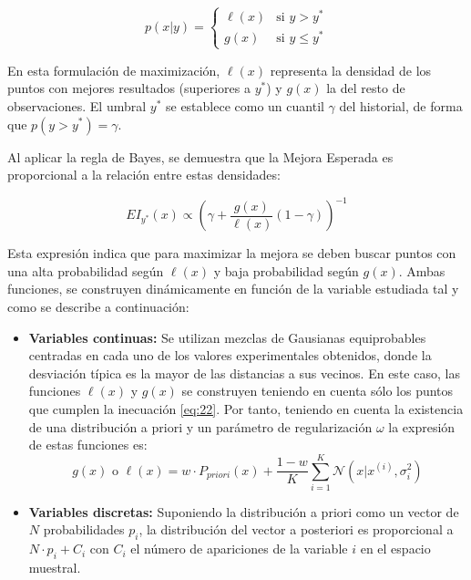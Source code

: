 \documentclass[11pt,a4paper]{article}
\begin{document}
	\begin{equation}
		p(x|y) = 
		\begin{cases} 
			\ell(x) & \text{si } y > y^* \\ g(x) & \text{si } y \leq y^*
		 \end{cases}
		 \label{eq:22}
	\end{equation}
	
	En esta formulación de maximización, $\ell(x)$ representa la densidad de los puntos con mejores resultados (superiores a $y^*$) y $g(x)$ la del resto de observaciones. El umbral $y^*$ se establece como un cuantil $\gamma$ del historial, de forma que $p(y > y^*) = \gamma$. 
	\newline
	
	Al aplicar la regla de Bayes, se demuestra que la Mejora Esperada es proporcional a la relación entre estas densidades:
	
	\begin{equation}
		EI_{y^*}(x) \propto \left( \gamma + \frac{g(x)}{\ell(x)}(1 - \gamma) \right)^{-1}
	\end{equation}
	
	Esta expresión indica que para maximizar la mejora se deben buscar puntos con una alta probabilidad según $\ell(x)$ y baja probabilidad según $g(x)$. Ambas funciones, se construyen dinámicamente en función de la variable estudiada tal y como se describe a continuación:
	\begin{itemize}
		\item \textbf{Variables continuas:} Se utilizan mezclas de Gausianas equiprobables centradas en cada uno de los valores experimentales obtenidos, donde la desviación típica es la mayor de las distancias a sus vecinos. En este caso, las funciones \(\ell(x)\) y $g(x)$ se construyen teniendo en cuenta sólo los puntos que cumplen la inecuación \ref{eq:22}. Por tanto, teniendo en cuenta la existencia de una distribución a priori y un parámetro de regularización $\omega$ la expresión de estas funciones es:
		\begin{equation}
				g(x)\text{ o }  \ell(x)= w \cdot P_{priori}(x) + \frac{1-w}{K} \sum_{i=1}^{K} \mathcal{N}(x | x^{(i)}, \sigma_i^2)
		\end{equation}
		\item \textbf{Variables discretas:} Suponiendo la distribución a priori como un vector de \(N\) probabilidades \(p_i\), la distribución del vector a posteriori es proporcional a \(N\cdot p_i + C_i\) con \(C_i\) el número de apariciones de la variable \(i\) en el espacio muestral.
	\end{itemize}
	
\end{document}
